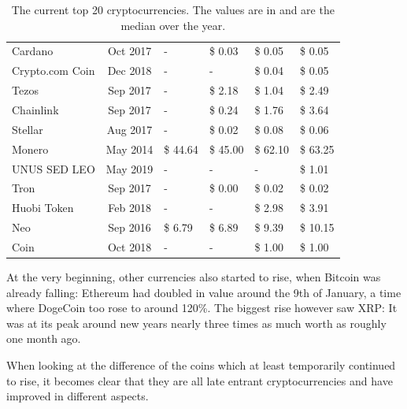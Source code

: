 \documentclass[11pt,a4paper,compsoc,conference]{IEEEtran}
\begin{document}
\begin{table}
{\begin{tabular}{@{}l|c|llll@{}}
Cardano         & Oct 2017     & - & \$           0.03 & \$           0.05 & \$           0.05  \\
Crypto.com Coin & Dec 2018     & -                    & -                  & \$           0.04 & \$           0.05  \\
Tezos           & Sep 2017     &  -                   & \$           2.18 & \$           1.04 & \$           2.49   \\
Chainlink       & Sep 2017     &  -                    & \$           0.24 & \$           1.76 & \$           3.64 \\
Stellar         & Aug 2017     &  -                     & \$           0.02 & \$           0.08 & \$           0.06  \\
Monero          & May 2014     & \$           44.64  & \$         45.00  & \$         62.10  & \$         63.25    \\
UNUS SED LEO    & May 2019     & -                    & -                  &  -                     & \$           1.01   \\
Tron            & Sep 2017     & - & \$           0.00 & \$           0.02 & \$           0.02   \\
Huobi Token     & Feb 2018     & -                    & -                  & \$           2.98 & \$           3.91   \\
Neo             & Sep 2016     & \$             6.79 & \$           6.89 & \$           9.39 & \$         10.15    \\
 Coin        & Oct 2018     & -                    & -                  & \$           1.00 & \$           1.00  \\ \bottomrule
\end{tabular}%
}
\caption{The current top 20 cryptocurrencies. The values are in  and are the median over the year.}
\label{tab:my-table4}
\end{table}

At the very beginning, other currencies also started to rise, when Bitcoin was already falling: Ethereum had doubled in value around the 9th of January, a time where DogeCoin too rose to around 120\%. The biggest rise however saw XRP: It was at its peak around new years nearly three times as much worth as roughly one month ago.

When looking at the difference of the coins which at least temporarily continued to rise, it becomes clear that they are all late entrant cryptocurrencies and have improved in different aspects. 
\end{document}
